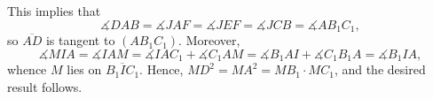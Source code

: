 This implies that \[\measuredangle DAB=\measuredangle JAF=\measuredangle JEF=\measuredangle JCB=\measuredangle AB_1C_1,\]
so $\overline{AD}$ is tangent to $(AB_1C_1)$. Moreover, \[\measuredangle MIA=\measuredangle IAM=\measuredangle IAC_1+\measuredangle C_1AM=\measuredangle B_1AI+\measuredangle C_1B_1A=\measuredangle B_1IA,\]
whence $M$ lies on $\overline{B_1IC_1}$. Hence, $MD^2=MA^2=MB_1\cdot MC_1$, and the desired result follows. 
%
%
%
%
%


